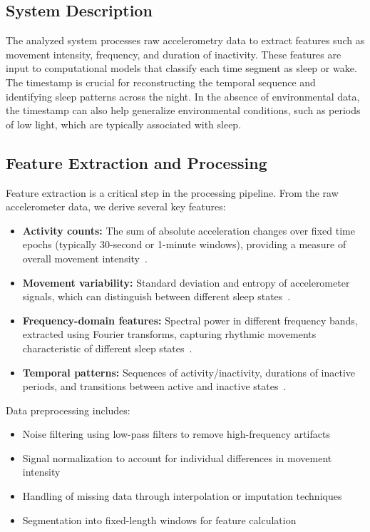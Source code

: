 \documentclass[conference]{IEEEtran}
\begin{document}
\subsection{System Description}
The analyzed system processes raw accelerometry data to extract features such as movement intensity, frequency, and duration of inactivity. These features are input to computational models that classify each time segment as sleep or wake. The timestamp is crucial for reconstructing the temporal sequence and identifying sleep patterns across the night. In the absence of environmental data, the timestamp can also help generalize environmental conditions, such as periods of low light, which are typically associated with sleep.

\subsection{Feature Extraction and Processing}
Feature extraction is a critical step in the processing pipeline. From the raw accelerometer data, we derive several key features:

\begin{itemize}
	\item \textbf{Activity counts:} The sum of absolute acceleration changes over fixed time epochs (typically 30-second or 1-minute windows), providing a measure of overall movement intensity~\cite{ancoli2003role, acebo2006}.
	\item \textbf{Movement variability:} Standard deviation and entropy of accelerometer signals, which can distinguish between different sleep states~\cite{sadeh1994activity, vanHees2015}.
	\item \textbf{Frequency-domain features:} Spectral power in different frequency bands, extracted using Fourier transforms, capturing rhythmic movements characteristic of different sleep states~\cite{zhang2020machine, griessenberger2013}.
	\item \textbf{Temporal patterns:} Sequences of activity/inactivity, durations of inactive periods, and transitions between active and inactive states~\cite{van2011review, sadeh2011, borbely1982}.
\end{itemize}

Data preprocessing includes:
\begin{itemize}
	\item Noise filtering using low-pass filters to remove high-frequency artifacts
	\item Signal normalization to account for individual differences in movement intensity
	\item Handling of missing data through interpolation or imputation techniques
	\item Segmentation into fixed-length windows for feature calculation
\end{itemize}
\end{document}

